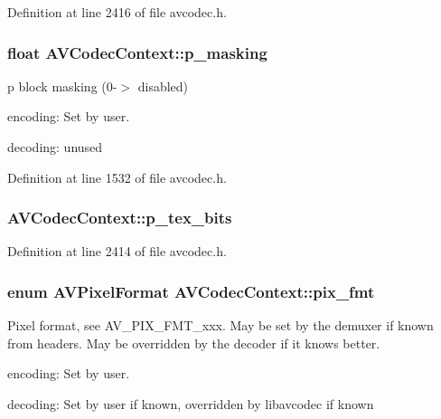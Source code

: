 Definition at line 2416 of file avcodec.\+h.

\subsubsection[{\texorpdfstring{p\+\_\+masking}{p_masking}}]{\setlength{\rightskip}{0pt plus 5cm}float A\+V\+Codec\+Context\+::p\+\_\+masking}\hypertarget{struct_a_v_codec_context_a906b4bb56c38c49ef2de171ccdc55e30}{}\label{struct_a_v_codec_context_a906b4bb56c38c49ef2de171ccdc55e30}
p block masking (0-\/$>$ disabled)
\begin{DoxyItemize}
\item encoding\+: Set by user.
\item decoding\+: unused 
\end{DoxyItemize}

Definition at line 1532 of file avcodec.\+h.

\subsubsection[{\texorpdfstring{p\+\_\+tex\+\_\+bits}{p_tex_bits}}]{ A\+V\+Codec\+Context\+::p\+\_\+tex\+\_\+bits}\hypertarget{struct_a_v_codec_context_a3afad86bb36a66785ba1da25ce557fb1}{}\label{struct_a_v_codec_context_a3afad86bb36a66785ba1da25ce557fb1}


Definition at line 2414 of file avcodec.\+h.

\subsubsection[{\texorpdfstring{pix\+\_\+fmt}{pix_fmt}}]{\setlength{\rightskip}{0pt plus 5cm}enum {\bf A\+V\+Pixel\+Format} A\+V\+Codec\+Context\+::pix\+\_\+fmt}\hypertarget{struct_a_v_codec_context_a0425c77b3d06d71e5db88b1d7e1b37f2}{}\label{struct_a_v_codec_context_a0425c77b3d06d71e5db88b1d7e1b37f2}
Pixel format, see A\+V\+\_\+\+P\+I\+X\+\_\+\+F\+M\+T\+\_\+xxx. May be set by the demuxer if known from headers. May be overridden by the decoder if it knows better.
\begin{DoxyItemize}
\item encoding\+: Set by user.
\item decoding\+: Set by user if known, overridden by libavcodec if known 
\end{DoxyItemize}

